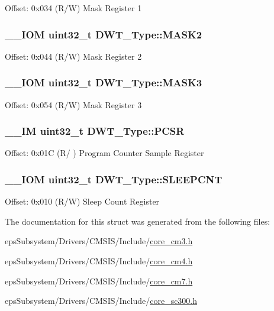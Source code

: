 Offset\-: 0x034 (R/\-W) Mask Register 1 \hypertarget{struct_d_w_t___type_a00ac4d830dfe0070a656cda9baed170f}{
\subsubsection[{M\-A\-S\-K2}]{\setlength{\rightskip}{0pt plus 5cm}\-\_\-\-\_\-\-I\-O\-M uint32\-\_\-t D\-W\-T\-\_\-\-Type\-::\-M\-A\-S\-K2}}\label{struct_d_w_t___type_a00ac4d830dfe0070a656cda9baed170f}
Offset\-: 0x044 (R/\-W) Mask Register 2 \hypertarget{struct_d_w_t___type_a2a509d8505c37a3b64f6b24993df5f3f}{
\subsubsection[{M\-A\-S\-K3}]{\setlength{\rightskip}{0pt plus 5cm}\-\_\-\-\_\-\-I\-O\-M uint32\-\_\-t D\-W\-T\-\_\-\-Type\-::\-M\-A\-S\-K3}}\label{struct_d_w_t___type_a2a509d8505c37a3b64f6b24993df5f3f}
Offset\-: 0x054 (R/\-W) Mask Register 3 \hypertarget{struct_d_w_t___type_a6353ca1d1ad9bc1be05d3b5632960113}{
\subsubsection[{P\-C\-S\-R}]{\setlength{\rightskip}{0pt plus 5cm}\-\_\-\-\_\-\-I\-M uint32\-\_\-t D\-W\-T\-\_\-\-Type\-::\-P\-C\-S\-R}}\label{struct_d_w_t___type_a6353ca1d1ad9bc1be05d3b5632960113}
Offset\-: 0x01\-C (R/ ) Program Counter Sample Register \hypertarget{struct_d_w_t___type_a416a54e2084ce66e5ca74f152a5ecc70}{
\subsubsection[{S\-L\-E\-E\-P\-C\-N\-T}]{\setlength{\rightskip}{0pt plus 5cm}\-\_\-\-\_\-\-I\-O\-M uint32\-\_\-t D\-W\-T\-\_\-\-Type\-::\-S\-L\-E\-E\-P\-C\-N\-T}}\label{struct_d_w_t___type_a416a54e2084ce66e5ca74f152a5ecc70}
Offset\-: 0x010 (R/\-W) Sleep Count Register 

The documentation for this struct was generated from the following files\-:\begin{DoxyCompactItemize}
\item 
eps\-Subsystem/\-Drivers/\-C\-M\-S\-I\-S/\-Include/\hyperlink{core__cm3_8h}{core\-\_\-cm3.\-h}\item 
eps\-Subsystem/\-Drivers/\-C\-M\-S\-I\-S/\-Include/\hyperlink{core__cm4_8h}{core\-\_\-cm4.\-h}\item 
eps\-Subsystem/\-Drivers/\-C\-M\-S\-I\-S/\-Include/\hyperlink{core__cm7_8h}{core\-\_\-cm7.\-h}\item 
eps\-Subsystem/\-Drivers/\-C\-M\-S\-I\-S/\-Include/\hyperlink{core__sc300_8h}{core\-\_\-sc300.\-h}\end{DoxyCompactItemize}
